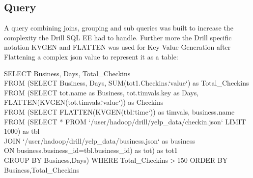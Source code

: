 \documentclass[a4paper,english]{report}
\begin{document}
			\subsection{Query}
				A query combining joins, grouping and sub queries was built to increase the complexity the Drill SQL EE had to handle. Further more the Drill specific notation KVGEN and FLATTEN was used for Key Value Generation after Flattening a complex json value to represent it as a table: \\
				\begin{flushleft}
				{\scriptsize 	
				SELECT Business, Days, Total\_Checkins \\
				FROM (SELECT Business, Days, SUM(tot1.Checkins.`value`) as Total\_Checkins\\
				FROM (SELECT tot.name as Business, tot.timvals.key as Days,\\ FLATTEN(KVGEN(tot.timvals.`value`)) as Checkins\\
				FROM (SELECT FLATTEN(KVGEN(tbl.`time`)) as timvals, business.name\\
				FROM (SELECT * FROM `/user/hadoop/drill/yelp\_data/checkin.json` LIMIT 1000) as tbl\\
				JOIN `/user/hadoop/drill/yelp\_data/business.json` as business\\
				ON business.business\_id=tbl.business\_id) as tot) as tot1\\
				GROUP BY Business,Days) WHERE Total\_Checkins$>$150 ORDER BY Business,Total\_Checkins\\
				}
				\end{flushleft}
			\clearpage
\end{document}
